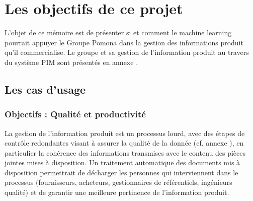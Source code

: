 \part{Les objectifs de ce projet}
    
    {\large
    L'objet de ce mémoire est de présenter si et comment le machine learning pourrait appuyer le Groupe Pomona dans la gestion des informations produit qu'il commercialise.
    Le groupe et sa gestion de l'information produit au travers du système PIM sont présentés en annexe .
    }

    \chapter{Les cas d'usage}
    \label{use_cases}

        \section{Objectifs : Qualité et productivité}

        La gestion de l'information produit est un processus lourd, avec des étapes de contrôle redondantes visant à assurer la qualité de la donnée (cf. annexe ), en particulier la cohérence des informations transmises avec le contenu des pièces jointes mises à disposition.
        Un traitement automatique des documents mis à disposition permettrait de décharger les personnes qui interviennent dans le processus (fournisseurs, acheteurs, gestionnaires de référentiels, ingénieurs qualité) et de garantir une meilleure pertinence de l'information produit.

